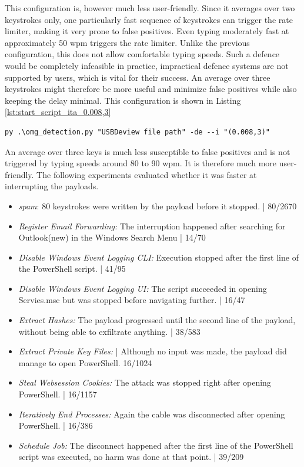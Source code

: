This configuration is, however much less user-friendly. Since it averages over two keystrokes only, one particularly fast sequence of keystrokes can trigger the rate limiter, making it very prone to false positives. Even typing moderately fast at approximately 50 wpm triggers the rate limiter. Unlike the previous configuration, this does not allow comfortable typing speeds. Such a defence would be completely infeasible in practice, impractical defence systems are not supported by users, which is vital for their success. An average over three keystrokes might therefore be more useful and minimize false positives while also keeping the delay minimal. This configuration is shown in Listing  \ref{lst:start_script_ita_0.008,3}   
\begin{lstlisting}[caption={start defence Script with ITA (0.008,3)},label={lst:start_script_ita_0.008,3}, captionpos=b]
 py .\omg_detection.py "USBDeview file path" -de --i "(0.008,3)"
\end{lstlisting}

An average over three keys is much less susceptible to false positives and is not triggered by typing speeds around 80 to 90 wpm. It is therefore much more user-friendly. The following experiments evaluated whether it was faster at interrupting the payloads. 

\begin{itemize}
    \item  \emph{spam}: 80 keystrokes were written by the payload before it stopped. | 80/2670
    \item  \emph{Register Email Forwarding:} The interruption happened after searching for Outlook(new) in the Windows Search Menu  | 14/70 
    \item  \emph{Disable Windows Event Logging CLI:}  Execution stopped after the first line of the PowerShell script. | 41/95
    \item  \emph{Disable Windows Event Logging UI:} The script succeeded in opening Servies.msc but was stopped before navigating further. | 16/47
    \item  \emph{Extract Hashes:}  The payload progressed until the second line of the payload, without being able to exfiltrate anything. | 38/583
    \item  \emph{Extract Private Key Files:}  | Although no input was made, the payload did manage to open PowerShell. 16/1024
    \item  \emph{Steal Websession Cookies:} The attack was stopped right after opening PowerShell. | 16/1157
    \item  \emph{Iteratively End Processes:} Again the cable was disconnected after opening PowerShell. | 16/386
    \item  \emph{Schedule Job:} The disconnect happened after the first line of the PowerShell script was executed, no harm was done at that point. | 39/209
\end{itemize}



